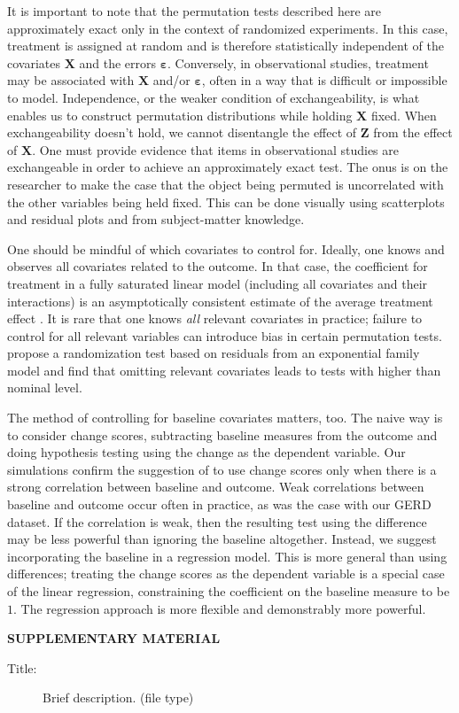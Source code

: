 \documentclass[12pt]{article}
\begin{document}
It is important to note that the permutation tests described here are approximately exact only in the context of randomized experiments.
In this case, treatment is assigned at random and is therefore statistically independent of the covariates $\mathbf{X}$ and the errors $\mathbf{\varepsilon}$.
Conversely, in observational studies, treatment may be associated with $\mathbf{X}$ and/or $\mathbf{\varepsilon}$, often in a way that is difficult or impossible to model.
Independence, or the weaker condition of exchangeability, is what enables us to construct permutation distributions while holding $\mathbf{X}$ fixed.
When exchangeability doesn't hold, we cannot disentangle the effect of $\mathbf{Z}$ from the effect of $\mathbf{X}$.
One must provide evidence that items in observational studies are exchangeable in order to achieve an approximately exact test.
The onus is on the researcher to make the case that the object being permuted is uncorrelated with the other variables being held fixed.
This can be done visually using scatterplots and residual plots \cite{freedman_nonstochastic_1983} and from subject-matter knowledge.

One should be mindful of which covariates to control for.
Ideally, one knows and observes all covariates related to the outcome.
In that case, the coefficient for treatment in a fully saturated linear model (including all covariates and their interactions) is an asymptotically consistent estimate of the average treatment effect \cite{lin_agnostic_2013}.
It is rare that one knows \textit{all} relevant covariates in practice; failure to control for all relevant variables can introduce bias in certain permutation tests.
 \cite{gail_tests_1988} propose a randomization test based on residuals from an exponential family model and find that omitting relevant covariates leads to tests with higher than nominal level.
 
The method of controlling for baseline covariates matters, too.
The naive way is to consider change scores, subtracting baseline measures from the outcome and doing hypothesis testing using the change as the dependent variable.
Our simulations confirm the suggestion of \cite{frison_repeated_1992} to use change scores only when there is a strong correlation between baseline and outcome.
Weak correlations between baseline and outcome occur often in practice, as was the case with our GERD dataset.
If the correlation is weak, then the resulting test using the difference may be less powerful than ignoring the baseline altogether.
Instead, we suggest incorporating the baseline in a regression model.
This is more general than using differences;
treating the change scores as the dependent variable is a special case of the linear regression, constraining the coefficient on the baseline measure to be $1$.
The regression approach is more flexible and demonstrably more powerful.



\bigskip
\begin{center}
{\large\bf SUPPLEMENTARY MATERIAL}
\end{center}

\begin{description}

\item[Title:] Brief description. (file type)

\end{description}




\end{document}
